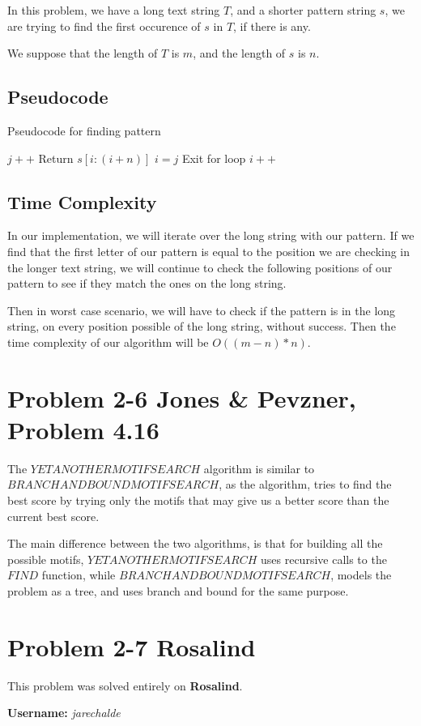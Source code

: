 \documentclass{article}
\begin{document}
In this problem, we have a long text string $T$, and a shorter pattern string $s$, we are trying to find the first occurence of $s$ in $T$, if there is any.

We suppose that the length of $T$ is $m$, and the length of $s$ is $n$.

\subsection*{Pseudocode}

\begin{algorithm}[H]
\caption{Pseudocode for finding pattern}
\begin{algorithmic}
       \State $j++$
      \EndIf
       \State Return $s[i:(i+n)]$
      \EndIf
     \EndIf
      \State $i = j$
      \State Exit for loop
     \EndIf
    \EndFor
  \EndIf
   \State $i++$
  \EndIf
 \EndWhile
\EndFunction
\end{algorithmic}
\end{algorithm}

\subsection*{Time Complexity}

In our implementation, we will iterate over the long string with our pattern. If we find that the first letter of our pattern is equal to the position we are checking in the longer text string, we will continue to check the following positions of our pattern to see if they match the ones on the long string. 

Then in worst case scenario, we will have to check if the pattern is in the long string, on every position possible of the long string, without success. Then the time complexity of our algorithm will be $O((m-n)*n)$.

\section*{Problem 2-6 Jones \& Pevzner, Problem 4.16}

The $YETANOTHERMOTIFSEARCH$ algorithm is similar to $BRANCHANDBOUNDMOTIFSEARCH$, as the algorithm, tries to find the best score by trying only the motifs that may give us a better score than the current best score.

The main difference between the two algorithms, is that for building all the possible motifs, $YETANOTHERMOTIFSEARCH$ uses recursive calls to the $FIND$ function, while $BRANCHANDBOUNDMOTIFSEARCH$, models the problem as a tree, and uses branch and bound for the same purpose.

\section*{Problem 2-7 Rosalind}

This problem was solved entirely on \textbf{Rosalind}.

\textbf{Username:} \textit{jarechalde}
\end{document}
